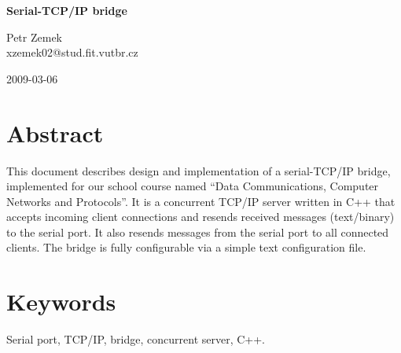 \documentclass{article}
\begin{document}
  \begin{center}
    \textbf{{\huge Serial-TCP/IP bridge}} \\
    \bigskip

     {\large \hfill Petr Zemek} \\
      \smallskip
     {\large \hfill xzemek02@stud.fit.vutbr.cz}
  \end{center}
   \hfill 2009-03-06
  \bigskip


  \section*{Abstract}
  This document describes design and implementation of a serial-TCP/IP bridge,
  implemented for our school course named ``Data Communications,
  Computer Networks and Protocols''. It is a concurrent TCP/IP server written
  in C++ that accepts incoming client connections and resends received messages
  (text/binary) to the serial port. It also resends messages from the serial
  port to all connected clients. The bridge is fully configurable via a simple
  text configuration file.

  \section*{Keywords}
  Serial port, TCP/IP, bridge, concurrent server, C++.


  

  \begin{flushleft}
  
  \end{flushleft}
\end{document}
